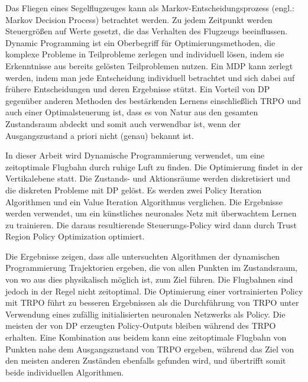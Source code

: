 Das Fliegen eines Segelflugzeuges kann als Markov-Entscheidungsprozess (engl.: Markov Decision Process) betrachtet werden. Zu jedem Zeitpunkt werden Steuergrößen auf Werte gesetzt, die das Verhalten des Flugzeugs beeinflussen. Dynamic Programming ist ein Oberbegriff für Optimierungsmethoden, die komplexe Probleme in Teilprobleme zerlegen und individuell lösen, indem sie Erkenntnisse aus bereits gelösten Teilproblemen nutzen. Ein MDP kann zerlegt werden, indem man jede Entscheidung individuell betrachtet und sich dabei auf frühere Entscheidungen und deren Ergebnisse stützt. Ein Vorteil von DP gegenüber anderen Methoden des bestärkenden Lernens einschließlich TRPO und auch einer Optimalsteuerung ist, dass es von Natur aus den gesamten Zustandsraum abdeckt und somit auch verwendbar ist, wenn der Ausgangszustand a priori nicht (genau) bekannt ist.

In dieser Arbeit wird Dynamische Programmierung verwendet, um eine zeitoptimale Flugbahn durch ruhige Luft zu finden. Die Optimierung findet in der Vertikalebene statt. Die Zustands- und Aktionsräume werden diskretisiert und die diskreten Probleme mit DP gelöst. Es werden zwei Policy Iteration Algorithmen und ein Value Iteration Algorithmus verglichen. Die Ergebnisse werden verwendet, um ein künstliches neuronales Netz mit überwachtem Lernen zu trainieren. Die daraus resultierende Steuerungs-Policy wird dann durch Trust Region Policy Optimization optimiert.

Die Ergebnisse zeigen, dass alle untersuchten Algorithmen der dynamischen Programmierung Trajektorien ergeben, die von allen Punkten im Zustandsraum, von wo aus dies physikalisch möglich ist, zum Ziel führen. Die Flugbahnen sind jedoch in der Regel nicht zeitoptimal. Die Optimierung einer vortrainierten Policy mit TRPO führt zu besseren Ergebnissen als die Durchführung von TRPO unter Verwendung eines zufällig initialisierten neuronalen Netzwerks als Policy. Die meisten der von DP erzeugten Policy-Outputs bleiben während des TRPO erhalten. Eine Kombination aus beidem kann eine zeitoptimale Flugbahn von Punkten nahe dem Ausgangszustand von TRPO ergeben, während das Ziel von den meisten anderen Zuständen ebenfalls gefunden wird, und übertrifft somit beide individuellen Algorithmen.

